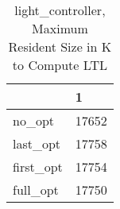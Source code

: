 \begin{table}
\caption{light\_controller, Maximum Resident Size in K to Compute LTL}
\label{light_controller_LTL_size}
\begin{tabular}{ll}
\toprule
 & 1 \\
\midrule
no\_opt & 17652 \\
last\_opt & 17758 \\
first\_opt & 17754 \\
full\_opt & 17750 \\
\bottomrule
\end{tabular}
\end{table}
